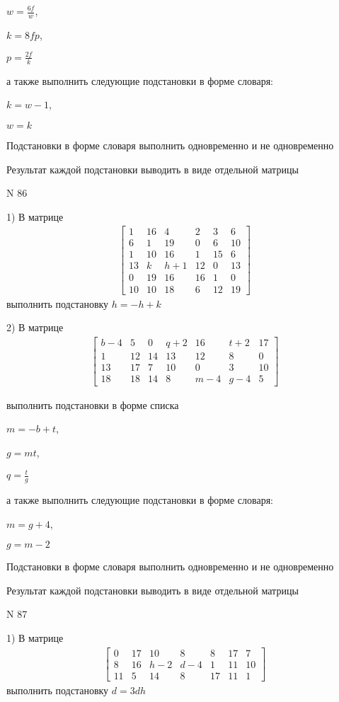 \documentclass[11pt]{report}
\begin{document}
$w=\frac{6 f}{w}$,

$k=8 f p$,

$p=\frac{2 f}{k}$

а также выполнить следующие подстановки в форме словаря:

$k=w - 1$,

$w=k$


    Подстановки в форме словаря выполнить одновременно и не одновременно


    Результат каждой подстановки выводить в виде отдельной матрицы

\newpage
N 86


    1) В матрице
\begin{align*}
\left[\begin{matrix}1 & 16 & 4 & 2 & 3 & 6\\6 & 1 & 19 & 0 & 6 & 10\\1 & 10 & 16 & 1 & 15 & 6\\13 & k & h + 1 & 12 & 0 & 13\\0 & 19 & 16 & 16 & 1 & 0\\10 & 10 & 18 & 6 & 12 & 19\end{matrix}\right]
\end{align*}
выполнить подстановку $h=- h + k$


    2) В матрице
\begin{align*}
\left[\begin{matrix}b - 4 & 5 & 0 & q + 2 & 16 & t + 2 & 17\\1 & 12 & 14 & 13 & 12 & 8 & 0\\13 & 17 & 7 & 10 & 0 & 3 & 10\\18 & 18 & 14 & 8 & m - 4 & g - 4 & 5\end{matrix}\right]
\end{align*}

выполнить подстановки в форме списка

$m=- b + t$,

$g=m t$,

$q=\frac{t}{g}$

а также выполнить следующие подстановки в форме словаря:

$m=g + 4$,

$g=m - 2$


    Подстановки в форме словаря выполнить одновременно и не одновременно


    Результат каждой подстановки выводить в виде отдельной матрицы

\newpage
N 87


    1) В матрице
\begin{align*}
\left[\begin{matrix}0 & 17 & 10 & 8 & 8 & 17 & 7\\8 & 16 & h - 2 & d - 4 & 1 & 11 & 10\\11 & 5 & 14 & 8 & 17 & 11 & 1\end{matrix}\right]
\end{align*}
выполнить подстановку $d=3 d h$
\end{document}
